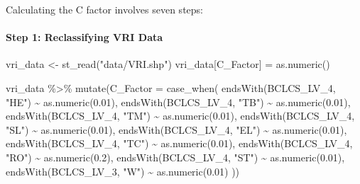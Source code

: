 \documentclass[
]{article}
\newenvironment{Shaded}{\begin{snugshade}}{\end{snugshade}}
\newcommand{\AttributeTok}[1]{\textcolor[rgb]{0.77,0.63,0.00}{#1}}
\newcommand{\FloatTok}[1]{\textcolor[rgb]{0.00,0.00,0.81}{#1}}
\newcommand{\FunctionTok}[1]{\textcolor[rgb]{0.00,0.00,0.00}{#1}}
\newcommand{\NormalTok}[1]{#1}
\newcommand{\OtherTok}[1]{\textcolor[rgb]{0.56,0.35,0.01}{#1}}
\newcommand{\SpecialCharTok}[1]{\textcolor[rgb]{0.00,0.00,0.00}{#1}}
\newcommand{\StringTok}[1]{\textcolor[rgb]{0.31,0.60,0.02}{#1}}
\begin{document}
Calculating the C factor involves seven steps:

\hypertarget{sec-step-1-reclassifying-vri-data-c}{%
\paragraph*{Step 1: Reclassifying VRI Data}\label{sec-step-1-reclassifying-vri-data-c}}

\begin{Shaded}
\begin{Highlighting}[]
\NormalTok{vri\_data }\OtherTok{\textless{}{-}} \FunctionTok{st\_read}\NormalTok{(}\StringTok{"data/VRI.shp"}\NormalTok{)}
\NormalTok{vri\_data[}\StringTok{\textquotesingle{}C\_Factor\textquotesingle{}}\NormalTok{] }\OtherTok{=} \FunctionTok{as.numeric}\NormalTok{()}

\NormalTok{vri\_data }\SpecialCharTok{\%\textgreater{}\%}
  \FunctionTok{mutate}\NormalTok{(}\AttributeTok{C\_Factor =} \FunctionTok{case\_when}\NormalTok{(}
    \FunctionTok{endsWith}\NormalTok{(BCLCS\_LV\_4, }\StringTok{"HE"}\NormalTok{) }\SpecialCharTok{\textasciitilde{}} \FunctionTok{as.numeric}\NormalTok{(}\FloatTok{0.01}\NormalTok{), }
    \FunctionTok{endsWith}\NormalTok{(BCLCS\_LV\_4, }\StringTok{"TB"}\NormalTok{) }\SpecialCharTok{\textasciitilde{}} \FunctionTok{as.numeric}\NormalTok{(}\FloatTok{0.01}\NormalTok{), }
    \FunctionTok{endsWith}\NormalTok{(BCLCS\_LV\_4, }\StringTok{"TM"}\NormalTok{) }\SpecialCharTok{\textasciitilde{}} \FunctionTok{as.numeric}\NormalTok{(}\FloatTok{0.01}\NormalTok{), }
    \FunctionTok{endsWith}\NormalTok{(BCLCS\_LV\_4, }\StringTok{"SL"}\NormalTok{) }\SpecialCharTok{\textasciitilde{}} \FunctionTok{as.numeric}\NormalTok{(}\FloatTok{0.01}\NormalTok{), }
    \FunctionTok{endsWith}\NormalTok{(BCLCS\_LV\_4, }\StringTok{"EL"}\NormalTok{) }\SpecialCharTok{\textasciitilde{}} \FunctionTok{as.numeric}\NormalTok{(}\FloatTok{0.01}\NormalTok{), }
    \FunctionTok{endsWith}\NormalTok{(BCLCS\_LV\_4, }\StringTok{"TC"}\NormalTok{) }\SpecialCharTok{\textasciitilde{}} \FunctionTok{as.numeric}\NormalTok{(}\FloatTok{0.01}\NormalTok{), }
    \FunctionTok{endsWith}\NormalTok{(BCLCS\_LV\_4, }\StringTok{"RO"}\NormalTok{) }\SpecialCharTok{\textasciitilde{}} \FunctionTok{as.numeric}\NormalTok{(}\FloatTok{0.2}\NormalTok{),}
    \FunctionTok{endsWith}\NormalTok{(BCLCS\_LV\_4, }\StringTok{"ST"}\NormalTok{) }\SpecialCharTok{\textasciitilde{}} \FunctionTok{as.numeric}\NormalTok{(}\FloatTok{0.01}\NormalTok{), }
    \FunctionTok{endsWith}\NormalTok{(BCLCS\_LV\_3, }\StringTok{"W"}\NormalTok{) }\SpecialCharTok{\textasciitilde{}} \FunctionTok{as.numeric}\NormalTok{(}\FloatTok{0.01}\NormalTok{)}
\NormalTok{    ))}
\end{Highlighting}
\end{Shaded}
\end{document}
